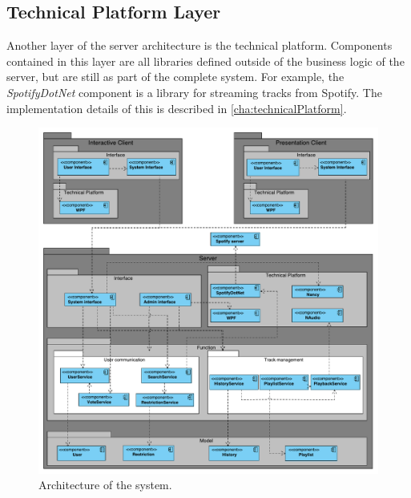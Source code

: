 \subsection{Technical Platform Layer}

Another layer of the server architecture is the
technical platform. Components contained in this layer are all
libraries defined outside of the business logic of the server, but are
still as part of the complete system. For example, the
\textit{SpotifyDotNet} component is a library for streaming tracks from
Spotify. The implementation details of this is described in
\cref{cha:technicalPlatform}.

\begin{figure}[hbtp]
  \centering
  \includegraphics[width=1.2\linewidth]{Images/Arkitektur.pdf}
  \caption{Architecture of the system.}\label{fig:architecture}
\end{figure}
